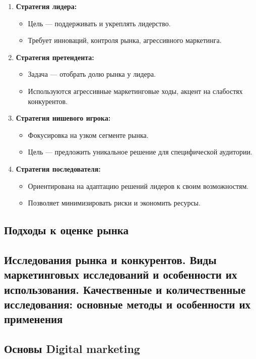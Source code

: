 \begin{enumerate}
    \item \textbf{Стратегия лидера:}
    \begin{itemize}
        \item Цель — поддерживать и укреплять лидерство.
        \item Требует инноваций, контроля рынка, агрессивного маркетинга.
    \end{itemize}
    \item \textbf{Стратегия претендента:}
    \begin{itemize}
        \item Задача — отобрать долю рынка у лидера.
        \item Используются агрессивные маркетинговые ходы, акцент на слабостях конкурентов.
    \end{itemize}
    \item \textbf{Стратегия нишевого игрока:}
    \begin{itemize}
        \item Фокусировка на узком сегменте рынка.
        \item Цель — предложить уникальное решение для специфической аудитории.
    \end{itemize}
    \item \textbf{Стратегия последователя:}
    \begin{itemize}
        \item Ориентирована на адаптацию решений лидеров к своим возможностям.
        \item Позволяет минимизировать риски и экономить ресурсы.
    \end{itemize}
\end{enumerate}

\pagebreak

\subsection{Подходы к оценке рынка}

\pagebreak

\subsection{Исследования рынка и конкурентов. Виды маркетинговых исследований и особенности их использования. Качественные и количественные исследования: основные методы и особенности их применения}

\pagebreak

\subsection{Основы Digital marketing}

\pagebreak